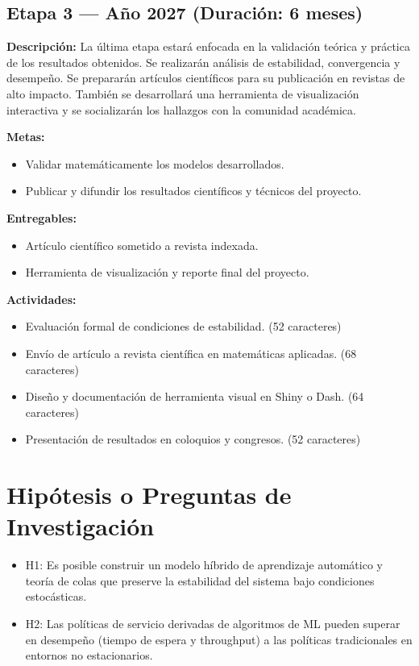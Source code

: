 \documentclass[12pt]{article}
\begin{document}
\subsection*{Etapa 3 — Año 2027 (Duración: 6 meses)}
\textbf{Descripción:} La última etapa estará enfocada en la validación teórica y práctica de los resultados obtenidos. Se realizarán análisis de estabilidad, convergencia y desempeño. Se prepararán artículos científicos para su publicación en revistas de alto impacto. También se desarrollará una herramienta de visualización interactiva y se socializarán los hallazgos con la comunidad académica.

\textbf{Metas:}
\begin{itemize}
  \item Validar matemáticamente los modelos desarrollados.
  \item Publicar y difundir los resultados científicos y técnicos del proyecto.
\end{itemize}

\textbf{Entregables:}
\begin{itemize}
  \item Artículo científico sometido a revista indexada.
  \item Herramienta de visualización y reporte final del proyecto.
\end{itemize}

\textbf{Actividades:}
\begin{itemize}
  \item Evaluación formal de condiciones de estabilidad. (52 caracteres)
  \item Envío de artículo a revista científica en matemáticas aplicadas. (68 caracteres)
  \item Diseño y documentación de herramienta visual en Shiny o Dash. (64 caracteres)
  \item Presentación de resultados en coloquios y congresos. (52 caracteres)
\end{itemize}




\section{Hipótesis o Preguntas de Investigación}
\begin{itemize}
  \item H1: Es posible construir un modelo híbrido de aprendizaje automático y teoría de colas que preserve la estabilidad del sistema bajo condiciones estocásticas.
  \item H2: Las políticas de servicio derivadas de algoritmos de ML pueden superar en desempeño (tiempo de espera y throughput) a las políticas tradicionales en entornos no estacionarios.
\end{itemize}
\end{document}
